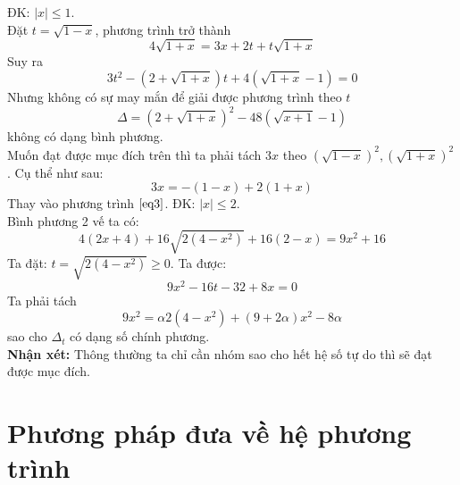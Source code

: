 \hda
ĐK: $|x| \leq 1$.\\
Đặt $t = \sqrt {1 - x}$, phương trình trở thành 
\begin{equation} \label{eq3}
4\sqrt {1 + x} = 3x + 2t + t\sqrt {1 + x}
\end{equation}
Suy ra
$$3t^2 - \left( {2 + \sqrt {1 + x} } \right)t + 4\left( {\sqrt {1 + x} - 1} \right) = 0$$
Nhưng không có sự may mắn để giải được phương trình theo $t$
$$\Delta = \left( {2 + \sqrt {1 + x} } \right)^2 - 48\left( {\sqrt {x + 1} - 1} \right)$$ 
không có dạng bình phương.\\
Muốn đạt được mục đích trên thì ta phải tách $3x$ theo $\left( {\sqrt {1 - x} } \right)^2 , \left( {\sqrt {1 + x} } \right)^2 $. Cụ thể như sau:  
$$3x = - \left( {1 - x} \right) + 2\left( {1 + x} \right)$$ 
Thay vào phương trình $\eqref{eq3}$.
\hda
ĐK: $|x| \leq 2$.\\
Bình phương 2 vế ta có:
$$4\left( {2x + 4} \right) + 16\sqrt {2\left( {4 - x^2 } \right)} + 16\left( {2 - x} \right) = 9x^2 + 16$$
Ta đặt: $t = \sqrt {2\left( {4 - x^2 } \right)} \ge 0$. Ta được: 
$$9x^2 - 16t - 32 + 8x = 0$$
Ta phải tách $$9x^2 = \alpha 2\left( {4 - x^2 } \right) + \left( {9 + 2\alpha } \right)x^2 - 8\alpha $$ sao cho $\Delta _t $ có dạng số chính phương.\\
\textbf{Nhận xét:}  Thông thường ta chỉ cần nhóm sao cho hết hệ số tự do thì sẽ đạt được mục đích.
\section{Phương pháp đưa về hệ phương trình}
